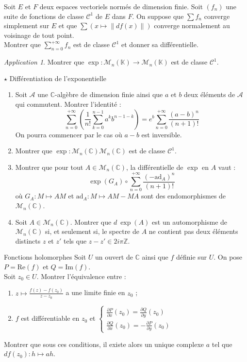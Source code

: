 \documentclass[french,a4paper]{article}
\newcommand{\Z}{\mathbb{Z}}
\newcommand{\C}{\mathbb{C}}
\newcommand{\K}{\mathbb{K}}
\theoremstyle{plain}
\theoremstyle{definition}
\theoremstyle{remark}
\newtheorem*{app}{Application}
\begin{document}
\begin{ex}{}
	Soit $E$ et $F$ deux espaces vectoriels normés de dimension finie. Soit $(f_n)$ une suite de fonctions de classe $\mathcal{C}^1$ de $E$ dans $F$. On suppose que $\sum f_n$ converge simplement sur $E$ et que $\displaystyle\sum(x\mapsto\lVert df(x)\rVert)$ converge normalement au voisinage de tout point. \\ Montrer que $\displaystyle\sum_{n=0}^{+\infty}f_n$ est de classe $\mathcal{C}^1$ et donner sa différentielle.
\end{ex}
\begin{app}
	Montrer que $\exp:\mathcal{M}_n(\K)\to\mathcal{M}_n(\K)$ est de classe $\mathcal{C}^1$.
\end{app}

\begin{ex}[Moulin.CD.12]{$\star$ Différentiation de l'exponentielle}
	\begin{enumerate}
		\item Soit $\mathcal{A}$ une $\C$-algèbre de dimension finie ainsi que $a$ et $b$ deux éléments de $\mathcal{A}$ qui commutent. Montrer l'identité : $$\sum_{n=0}^{+\infty}\left(\frac{1}{n!}\sum_{k=0}^{n-1}a^kb^{n-1-k}\right)=e^b\sum_{n=0}^{+\infty}\frac{(a-b)^n}{(n+1)!}$$ On pourra commencer par le cas où $a-b$ est inversible.
		\item Montrer que $\exp:\mathcal{M}_n(\C)\mathcal{M}_n(\C)$ est de classe $\mathcal{C}^1$.
		\item Montrer que pour tout $A\in\mathcal{M}_n(\C)$, la différentielle de $\exp$ en $A$ vaut : $$\exp(G_A)\circ\sum_{n=0}^{+\infty}\frac{(-\text{ad}_A)^n}{(n+1)!}$$ où $G_A:M\mapsto AM$ et $\text{ad}_A:M\mapsto AM-MA$ sont des endomorphismes de $\mathcal{M}_n(\C)$.
		\item Soit $A\in\mathcal{M}_n(\C)$. Montrer que $d\ \exp(A)$ est un automorphisme de $\mathcal{M}_n(\C)$ si, et seulement si, le spectre de $A$ ne contient pas deux éléments distincts $z$ et $z'$ tels que $z-z'\in 2i\pi\Z$.
	\end{enumerate}
\end{ex}
\begin{ex}[Moulin.CD.13]{Fonctions holomorphes}
	Soit $U$ un ouvert de $\C$ ainsi que $f$ définie sur $U$. On pose $P=\text{Re}(f)$ et $Q=\text{Im}(f)$.\\
	Soit $z_0\in U$. Montrer l'équivalence entre : 
	\begin{enumerate}[label=(\roman*)]
		\item $z\mapsto\displaystyle\frac{f(z)-f(z_0)}{z-z_0}$ a une limite finie en $z_0$ ;
		\item $f$ est différentiable en $z_0$ et $\displaystyle\begin{cases}
			\displaystyle\frac{\partial P}{\partial x}(z_0)=\frac{\partial Q}{\partial y}(z_0) \\
			\displaystyle\frac{\partial Q}{\partial x}(z_0)=-\frac{\partial P}{\partial y}(z_0)
		\end{cases}$
	\end{enumerate}
	Montrer que sous ces conditions, il existe alors un unique complexe $a$ tel que $df(z_0):h\mapsto ah$.
\end{ex}
\end{document}
